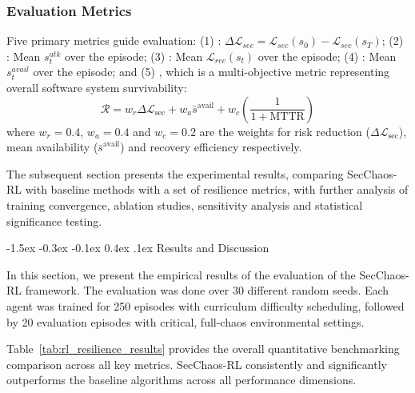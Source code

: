\documentclass[conference,10pt]{IEEEtran}
\makeatletter
\renewcommand\section{\@startsection{section}{1}{\z@}%
	{-1.5ex \@plus -0.3ex \@minus -0.1ex}%
	{0.4ex \@plus.1ex}%
	{\normalfont\large\bfseries\centering}}
\makeatother
\begin{document}
\subsubsection{Evaluation Metrics}

Five primary metrics guide evaluation: (1) : $\Delta\mathcal{L}_{sec} = \mathcal{L}_{sec}(s_0) - \mathcal{L}_{sec}(s_T)$; (2) : Mean $s_t^{atk}$ over the episode; (3) : Mean $\mathcal{L}_{rec}(s_t)$ over the episode; (4) : Mean $s_t^{avail}$ over the episode; and (5) , which is a multi-objective metric representing overall software system survivability:
\begin{equation}
	\mathcal{R} = w_r \Delta\mathcal{L}_{\text{sec}} + w_a \bar{s}^{\text{avail}} + w_c \left(\frac{1}{1 + \text{MTTR}}\right)
\end{equation}
where $w_r=0.4$, $w_a=0.4$ and $w_c=0.2$ are the weights for risk reduction ($\Delta\mathcal{L}_{\text{sec}}$), mean availability ($\bar{s}^{\text{avail}}$) and recovery efficiency respectively. 

The subsequent section presents the experimental results, comparing SecChaos-RL with baseline methods with a set of resilience metrics, with further analysis of training convergence, ablation studies, sensitivity analysis and statistical significance testing. 
	
	
	
	
	
	
	
	
	\section{Results and Discussion}
	
In this section, we present the empirical results of the evaluation of the SecChaos-RL framework. The evaluation was done over 30 different random seeds. Each agent was trained for 250 episodes with curriculum difficulty scheduling, followed by 20 evaluation episodes with critical, full-chaos environmental settings.
	
	Table~\ref{tab:rl_resilience_results} provides the overall quantitative benchmarking comparison across all key metrics. SecChaos-RL consistently and significantly outperforms the baseline algorithms across all performance dimensions.
	
\end{document}
